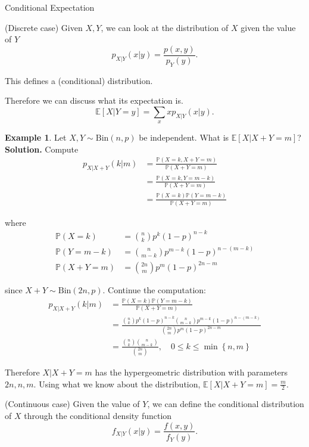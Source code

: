 \documentclass[a4paper,11pt]{amsbook}
\makeatletter
\def\section{\@startsection{section}{2}%
    \z@{1\linespacing\@plus1\linespacing}{.5\linespacing}%
    {\large\normalfont\bfseries\centering\color{darkblue}}}
\theoremstyle{definition}
\newtheorem{example}{\hspace{-2em} \color{darkblue} Example}[chapter]
\theoremstyle{remark}
\newcommand{\E}{\mathbb{E}}
\renewcommand{\P}{\mathbb{P}}
\newcommand\0{\varnothing}
\newcommand\Bin{\text{Bin}}
\makeatother
\begin{document}
\section{Conditional Expectation} \label{sec::cond_exp}

\noindent (Discrete case) Given $X,Y$, we can look at the distribution of $X$ given the value of $Y$ 
$$p_{X|Y}(x|y)=\frac{p(x,y)}{p_Y(y)}.$$

This defines a (conditional) distribution.

Therefore we can discuss what its expectation is.
$$\E[X|Y=y]=\sum_{x}xp_{X|Y}(x|y).$$

\begin{example}
    Let $X,Y\sim\Bin(n,p)$ be independent. What is $\E[X|X+Y=m]$?\\
    \textbf{Solution.} Compute
    \begin{align*}
        p_{X|X+Y}(k|m)&=\frac{\P(X=k,X+Y=m)}{\P(X+Y=m)} \\
        &=\frac{\P(X=k,Y=m-k)}{\P(X+Y=m)} \\
        &=\frac{\P(X=k)\P(Y=m-k)}{\P(X+Y=m)}
    \end{align*}

    where \begin{align*}
        \P(X=k)&=\binom{n}{k}p^k(1-p)^{n-k} \\
        \P(Y=m-k)&=\binom{n}{m-k}p^{m-k}(1-p)^{n-(m-k)} \\
        \P(X+Y=m)&=\binom{2n}{m}p^m(1-p)^{2n-m}
    \end{align*}

    since $X+Y\sim\Bin(2n,p)$. Continue the computation: \begin{align*}
        p_{X|X+Y}(k|m)&=\frac{\P(X=k)\P(Y=m-k)}{\P(X+Y=m)} \\
        &=\frac{\binom{n}{k}p^k(1-p)^{n-k}\binom{n}{m-k}p^{m-k}(1-p)^{n-(m-k)}}{\binom{2n}{m}p^m(1-p)^{2n-m}} \\
        &=\frac{\binom{n}{k}\binom{n}{m-k}}{\binom{2n}{m}},\quad0\leq k\leq\min\left\{n,m\right\}
    \end{align*}

    Therefore $X|X+Y=m$ has the hypergeometric distribution with parameters $2n,n,m$.
    Using what we know about the distribution, $\E[X|X+Y=m]=\frac{m}{2}$.
\end{example}

\noindent (Continuous case) Given the value of $Y$, we can define the conditional distribution of $X$
through the conditional density function $$f_{X|Y}(x|y)=\frac{f(x,y)}{f_Y(y)}.$$
\end{document}
